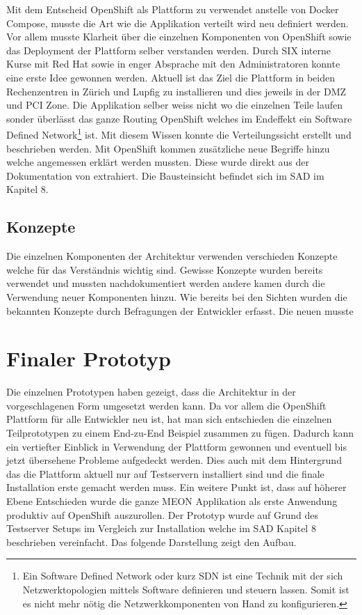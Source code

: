 Mit dem Entscheid OpenShift als Plattform zu verwendet anstelle von Docker Compose, musste die Art wie die Applikation verteilt wird neu definiert werden. Vor allem musste Klarheit über die einzelnen Komponenten von OpenShift sowie das Deployment der Plattform selber verstanden werden. Durch SIX interne Kurse mit Red Hat sowie in enger Absprache mit den Administratoren konnte eine erste Idee gewonnen werden. Aktuell ist das Ziel die Plattform in beiden Rechenzentren in Zürich und Lupfig zu installieren und dies jeweils in der DMZ und PCI Zone. Die Applikation selber weiss nicht wo die einzelnen Teile laufen sonder überlässt das ganze Routing OpenShift welches im Endeffekt ein Software Defined Network\footnote{Ein Software Defined Network oder kurz SDN ist eine Technik mit der sich Netzwerktopologien mittels Software definieren und steuern lassen. Somit ist es nicht mehr nötig die Netzwerkkomponenten von Hand zu konfigurieren. } ist. Mit diesem Wissen konnte die Verteilungssicht erstellt und beschrieben werden. Mit OpenShift kommen zusätzliche neue Begriffe hinzu welche angemessen erklärt werden mussten. Diese wurde direkt aus der Dokumentation von \cite{osservicepod} extrahiert. Die Bausteinsicht befindet sich im SAD im Kapitel 8.

\subsection{Konzepte}

Die einzelnen Komponenten der Architektur verwenden verschieden Konzepte welche für das Verständnis wichtig sind. Gewisse Konzepte wurden bereits verwendet und mussten nachdokumentiert werden andere kamen durch die Verwendung neuer Komponenten hinzu. Wie bereits bei den Sichten wurden die bekannten Konzepte durch Befragungen der Entwickler erfasst. Die neuen musste 

\section{Finaler Prototyp}

Die einzelnen Prototypen haben gezeigt, dass die Architektur in der vorgeschlagenen Form umgesetzt werden kann. Da vor allem die OpenShift Plattform für alle Entwickler neu ist, hat man sich entschieden die einzelnen Teilprototypen zu einem End-zu-End Beispiel zusammen zu fügen. Dadurch kann ein vertiefter Einblick in Verwendung der Plattform gewonnen und eventuell bis jetzt übersehene Probleme aufgedeckt werden. Dies auch mit dem Hintergrund das die Plattform aktuell nur auf Testservern installiert sind und die finale Installation erste gemacht werden muss. Ein weitere Punkt ist, dass auf höherer Ebene Entschieden wurde die ganze MEON Applikation als erste Anwendung produktiv auf OpenShift auszurollen.\newline\newline
Der Prototyp wurde auf Grund des Testserver Setups im Vergleich zur Installation welche im SAD Kapitel 8 beschrieben vereinfacht. Das folgende Darstellung zeigt den Aufbau.

